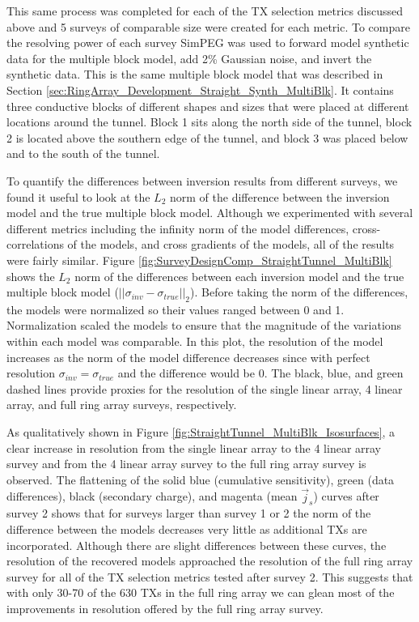 \documentclass[preprint,authoryear,12pt]{elsarticle}
\begin{document}
This same process was completed for each of the TX selection metrics discussed above and 5 surveys of comparable size were created for each metric. To compare the resolving power of each survey SimPEG was used to forward model synthetic data for the multiple block model, add 2\% Gaussian noise, and invert the synthetic data. This is the same multiple block model that was described in Section \ref{sec:RingArray_Development_Straight_Synth_MultiBlk}. It contains three conductive blocks of different shapes and sizes that were placed at different locations around the tunnel. Block 1 sits along the north side of the tunnel, block 2 is located above the southern edge of the tunnel, and block 3 was placed below and to the south of the tunnel.

To quantify the differences between inversion results from different surveys, we found it useful to look at the $L_2$ norm of the difference between the inversion model and the true multiple block model. Although we experimented with several different metrics including the infinity norm of the model differences, cross-correlations of the models, and cross gradients of the models, all of the results were fairly similar. Figure \ref{fig:SurveyDesignComp_StraightTunnel_MultiBlk} shows the $L_2$ norm of the differences between each inversion model and the true multiple block model ($\left|| \sigma_{inv} - \sigma_{true} \right||_2$). Before taking the norm of the differences, the models were normalized so their values ranged between 0 and 1. Normalization scaled the models to ensure that the magnitude of the variations within each model was comparable. In this plot, the resolution of the model increases as the norm of the model difference decreases since with perfect resolution $\sigma_{inv} = \sigma_{true}$ and the difference would be 0. The black, blue, and green dashed lines provide proxies for the resolution of the single linear array, 4 linear array, and full ring array surveys, respectively.

As qualitatively shown in Figure \ref{fig:StraightTunnel_MultiBlk_Isosurfaces}, a clear increase in resolution from the single linear array to the 4 linear array survey and from the 4 linear array survey to the full ring array survey is observed. The flattening of the solid blue (cumulative sensitivity), green (data differences), black (secondary charge), and magenta (mean $\vec{j}_s$) curves after survey 2 shows that for surveys larger than survey 1 or 2 the norm of the difference between the models decreases very little as additional TXs are incorporated. Although there are slight differences between these curves, the resolution of the recovered models approached the resolution of the full ring array survey for all of the TX selection metrics tested after survey 2. This suggests that with only 30-70 of the 630 TXs in the full ring array we can glean most of the improvements in resolution offered by the full ring array survey.
\end{document}
